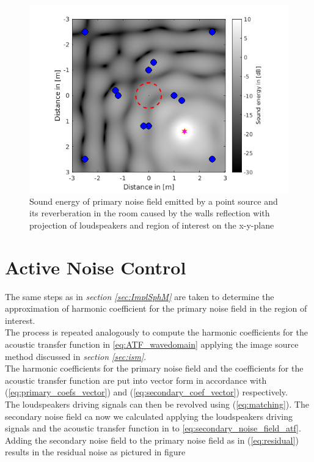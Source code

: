 \begin{figure}
    \centerline{\includegraphics[width=\textwidth]{LaTeX/images/plots/Point_source_reverberation.png}}
    \caption{Sound energy of primary noise field emitted by a point source and its reverberation in the room caused by the walls reflection with projection of loudspeakers and region of interest on the x-y-plane}
    \label{fig:reverberation}
\end{figure}

\section{Active Noise Control}
The same steps as in \textit{section \ref{sec:ImplSphM}} are taken to determine the approximation of harmonic coefficient for the primary noise field in the region of interest.\\
The process is repeated analogously to compute the harmonic coefficients for the acoustic transfer function in \ref{eq:ATF_wavedomain} applying the image source method discussed in \textit{section \ref{sec:ism}}.\\
The harmonic coefficients for the primary noise field and the coefficients for the acoustic transfer function are put into vector form in accordance with (\ref{eq:primary_coefs_vector}) and (\ref{eq:secondary_coef_vector}) respectively.\\
The loudspeakers driving signals can then be revolved using (\ref{eq:matching}).
The secondary noise field ca now we calculated applying the loudspeakers driving signals and the acoustic transfer function in to \ref{eq:secondary_noise_field_atf}. Adding the secondary noise field to the primary noise field as in (\ref{eq:residual}) results in the residual noise as pictured in figure 

